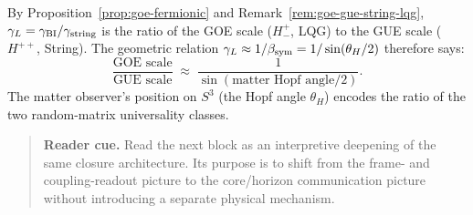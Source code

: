 \begin{remark}
\label{rem:dual-origin-goe-gue}
By Proposition~\ref{prop:goe-fermionic} and
Remark~\ref{rem:goe-gue-string-lqg},
$\gamma_L = \gamma_{\mathrm{BI}}/\gamma_{\mathrm{string}}$ is the ratio of the GOE scale ($H^+_-$, LQG) to
the GUE scale ($H^{++}$, String). The geometric relation $\gamma_L\approx
1/\beta_{\mathrm{sym}} = 1/\sin(\theta_H/2)$ therefore says:
\[
 \frac{\text{GOE scale}}{\text{GUE scale}}
 \;\approx\;
 \frac{1}{\sin(\text{matter Hopf angle}/2)}.
\]
The matter observer's position on $S^3$ (the Hopf angle $\theta_H$)
encodes the ratio of the two random-matrix universality classes.
\end{remark}

\begin{quote}\small
\noindent\textbf{Reader cue.} Read the next block as an interpretive deepening of the same closure architecture. Its purpose is to shift from the frame- and coupling-readout picture to the core/horizon communication picture without introducing a separate physical mechanism.
\end{quote}

